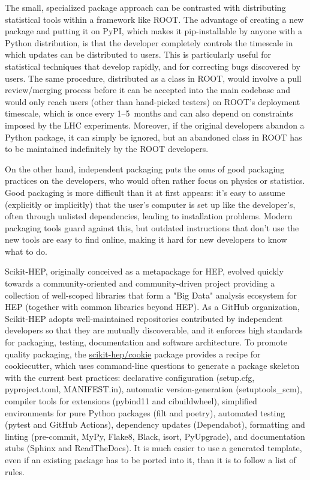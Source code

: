 \documentclass[12pt,a4paper]{article}
\begin{document}
The small, specialized package approach can be contrasted with distributing statistical tools within a framework like ROOT. The advantage of creating a new package and putting it on PyPI, which makes it pip-installable by anyone with a Python distribution, is that the developer completely controls the timescale in which updates can be distributed to users. This is particularly useful for statistical techniques that develop rapidly, and for correcting bugs discovered by users. The same procedure, distributed as a class in ROOT, would involve a pull review/merging process before it can be accepted into the main codebase and would only reach users (other than hand-picked testers) on ROOT's deployment timescale, which is once every 1--5~months and can also depend on constraints imposed by the LHC experiments. Moreover, if the original developers abandon a Python package, it can simply be ignored, but an abandoned class in ROOT has to be maintained indefinitely by the ROOT developers.

On the other hand, independent packaging puts the onus of good packaging practices on the developers, who would often rather focus on physics or statistics. Good packaging is more difficult than it at first appears: it's easy to assume (explicitly or implicitly) that the user's computer is set up like the developer's, often through unlisted dependencies, leading to installation problems. Modern packaging tools guard against this, but outdated instructions that don't use the new tools are easy to find online, making it hard for new developers to know what to do.

Scikit-HEP, originally conceived as a metapackage for HEP, evolved quickly towards a community-oriented and community-driven project providing a collection of well-scoped libraries that form a "Big Data" analysis ecosystem for HEP (together with common libraries beyond HEP). As a GitHub organization, Scikit-HEP adopts well-maintained repositories contributed by independent developers so that they are mutually discoverable, and it enforces high standards for packaging, testing, documentation and software architecture. To promote quality packaging, the \href{https://github.com/scikit-hep/cookie}{scikit-hep/cookie} package provides a recipe for cookiecutter, which uses command-line questions to generate a package skeleton with the current best practices: declarative configuration (setup.cfg, pyproject.toml, MANIFEST.in), automatic version-generation (setuptools\_scm), compiler tools for extensions (pybind11 and cibuildwheel), simplified environments for pure Python packages (filt and poetry), automated testing (pytest and GitHub Actions), dependency updates (Dependabot), formatting and linting (pre-commit, MyPy, Flake8, Black, isort, PyUpgrade), and documentation stubs (Sphinx and ReadTheDocs). It is much easier to use a generated template, even if an existing package has to be ported into it, than it is to follow a list of rules.
\end{document}
